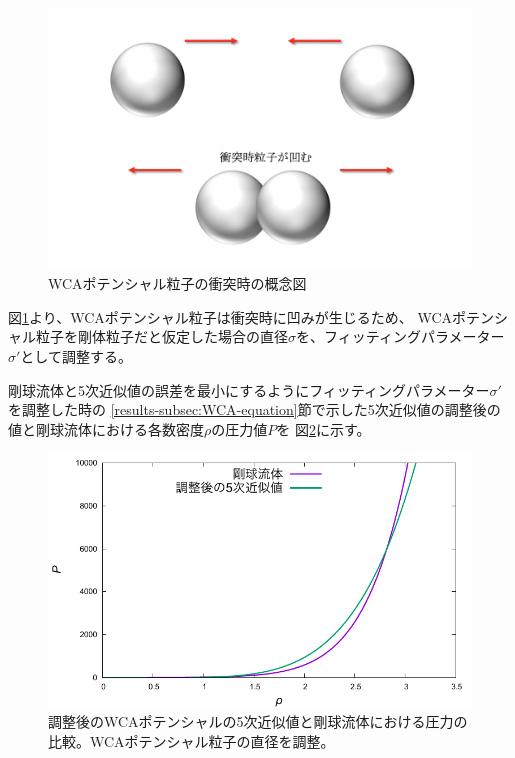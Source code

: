 \documentclass[titlepage]{jsreport}
\begin{document}
{{{\begin{figure}[htbp]
    \begin{center}
        \includegraphics[width=11.5cm]{fig/WCA-collision.png}
    \end{center}
    \caption{WCAポテンシャル粒子の衝突時の概念図}
    \label{fig:WCA-collision}
\end{figure}

\newpage
図\ref{fig:WCA-collision}より、WCAポテンシャル粒子は衝突時に凹みが生じるため、
WCAポテンシャル粒子を剛体粒子だと仮定した場合の直径$\sigma$を、フィッティングパラメーター${\sigma}'$として調整する。

剛球流体と5次近似値の誤差を最小にするようにフィッティングパラメーター${\sigma}'$を調整した時の
\ref{results-subsec:WCA-equation}節で示した5次近似値の調整後の値と剛球流体における各数密度$\rho$の圧力値$P$を
図\ref{fig:fit_compare_previous-research}に示す。

\begin{figure}[htbp]
    \begin{center}
        \includegraphics[width=14cm]{fig/fit_compare_previous-research.pdf}
    \end{center}
    \caption{調整後のWCAポテンシャルの5次近似値と剛球流体における圧力の比較。WCAポテンシャル粒子の直径を調整。}
    \label{fig:fit_compare_previous-research}
\end{figure}

}}}
\end{document}
